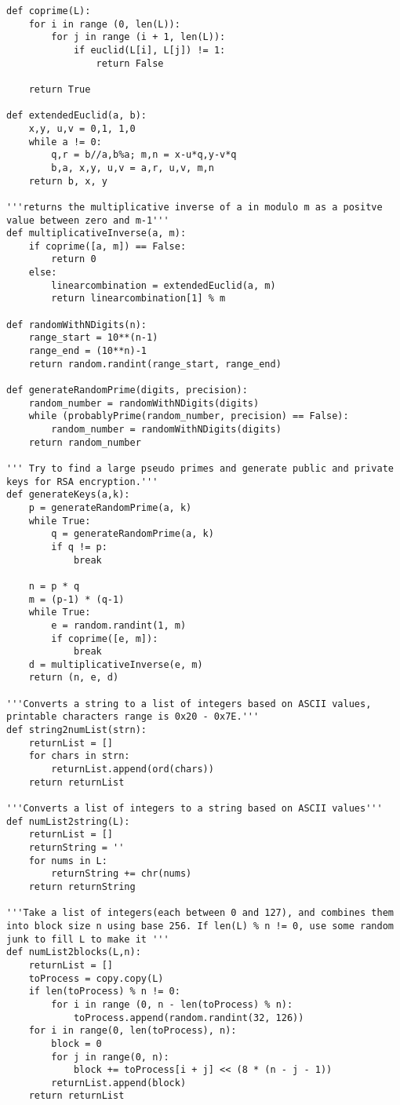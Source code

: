 \documentclass[a4paper,11pt]{article}
\theoremstyle{mytheor}
\begin{document}
\begin{lstlisting}[]
def coprime(L):
    for i in range (0, len(L)):
        for j in range (i + 1, len(L)):
            if euclid(L[i], L[j]) != 1:
                return False

    return True

def extendedEuclid(a, b):
    x,y, u,v = 0,1, 1,0
    while a != 0:
        q,r = b//a,b%a; m,n = x-u*q,y-v*q
        b,a, x,y, u,v = a,r, u,v, m,n
    return b, x, y

'''returns the multiplicative inverse of a in modulo m as a positve value between zero and m-1'''
def multiplicativeInverse(a, m):
    if coprime([a, m]) == False:
        return 0
    else:
        linearcombination = extendedEuclid(a, m)
        return linearcombination[1] % m

def randomWithNDigits(n):
    range_start = 10**(n-1)
    range_end = (10**n)-1
    return random.randint(range_start, range_end)

def generateRandomPrime(digits, precision):
    random_number = randomWithNDigits(digits)
    while (probablyPrime(random_number, precision) == False):
        random_number = randomWithNDigits(digits)
    return random_number

''' Try to find a large pseudo primes and generate public and private keys for RSA encryption.'''
def generateKeys(a,k):
    p = generateRandomPrime(a, k)
    while True:
        q = generateRandomPrime(a, k)
        if q != p:
            break
    
    n = p * q
    m = (p-1) * (q-1)
    while True:
        e = random.randint(1, m)
        if coprime([e, m]):
            break
    d = multiplicativeInverse(e, m)
    return (n, e, d)

'''Converts a string to a list of integers based on ASCII values, printable characters range is 0x20 - 0x7E.'''
def string2numList(strn):
    returnList = []
    for chars in strn:
        returnList.append(ord(chars))
    return returnList

'''Converts a list of integers to a string based on ASCII values'''
def numList2string(L):
    returnList = []
    returnString = ''
    for nums in L:
        returnString += chr(nums)
    return returnString

'''Take a list of integers(each between 0 and 127), and combines them into block size n using base 256. If len(L) % n != 0, use some random junk to fill L to make it '''
def numList2blocks(L,n):
    returnList = []
    toProcess = copy.copy(L)
    if len(toProcess) % n != 0:
        for i in range (0, n - len(toProcess) % n):
            toProcess.append(random.randint(32, 126))
    for i in range(0, len(toProcess), n):
        block = 0
        for j in range(0, n):
            block += toProcess[i + j] << (8 * (n - j - 1))
        returnList.append(block)
    return returnList


\end{lstlisting}
\end{document}
